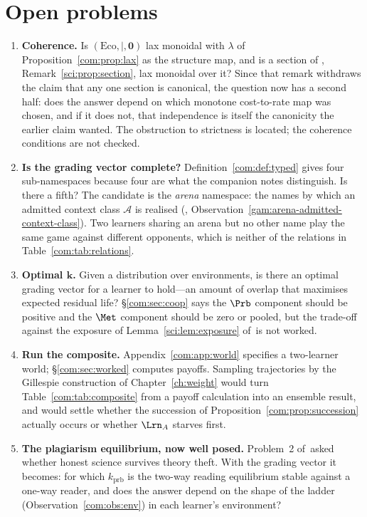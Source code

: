 \section{Open problems}\label{com:S15}

\begin{enumerate}[itemsep=4pt]
\item \textbf{Coherence.} Is $(\mathrm{Eco}, \mid, \mathbf{0})$ lax monoidal with
$\lambda$ of Proposition~\ref{com:prop:lax} as the structure map, and is a section of
\chSci, Remark~\ref{sci:prop:section}, lax monoidal over it? Since that remark withdraws the claim
that any one section is canonical, the question now has a second half: does the answer depend on which
monotone cost-to-rate map was chosen, and if it does not, that independence is itself the canonicity
the earlier claim wanted. The obstruction to strictness is located; the coherence conditions are not
checked.

\item \textbf{Is the grading vector complete?} Definition~\ref{com:def:typed} gives four
sub-namespaces because four are what the companion notes distinguish. Is there a fifth? The
candidate is the \emph{arena} namespace: the names by which an admitted context class
$\mathcal{A}$ is realised (\chGame, Observation~\ref{gam:arena-admitted-context-class}). Two learners sharing an arena but no other name
play the same game against different opponents, which is neither of the relations in
Table~\ref{com:tab:relations}.

\item \textbf{Optimal $\mathbf{k}$.} Given a distribution over environments, is there an optimal
grading vector for a learner to hold---an amount of overlap that maximises expected residual
life? \S\ref{com:sec:coop} says the $\Prb$ component should be positive and the $\Met$ component
should be zero or pooled, but the trade-off against the exposure of Lemma~\ref{sci:lem:exposure}
of~\chSci is not worked.

\item \textbf{Run the composite.} Appendix~\ref{com:app:world} specifies a two-learner world;
\S\ref{com:sec:worked} computes payoffs. Sampling trajectories by the Gillespie construction
of Chapter~\ref{ch:weight} would turn Table~\ref{com:tab:composite} from a payoff calculation into an
ensemble result, and would settle whether the succession of Proposition~\ref{com:prop:succession}
actually occurs or whether $\Lrn_A$ starves first.

\item \textbf{The plagiarism equilibrium, now well posed.} Problem~2 of~\chSci asked
whether honest science survives theory theft. With the grading vector it becomes: for which
$k_{\mathrm{prb}}$ is the two-way reading equilibrium stable against a one-way reader, and does
the answer depend on the shape of the ladder (Observation~\ref{com:obs:env}) in each learner's
environment?


\end{enumerate}
